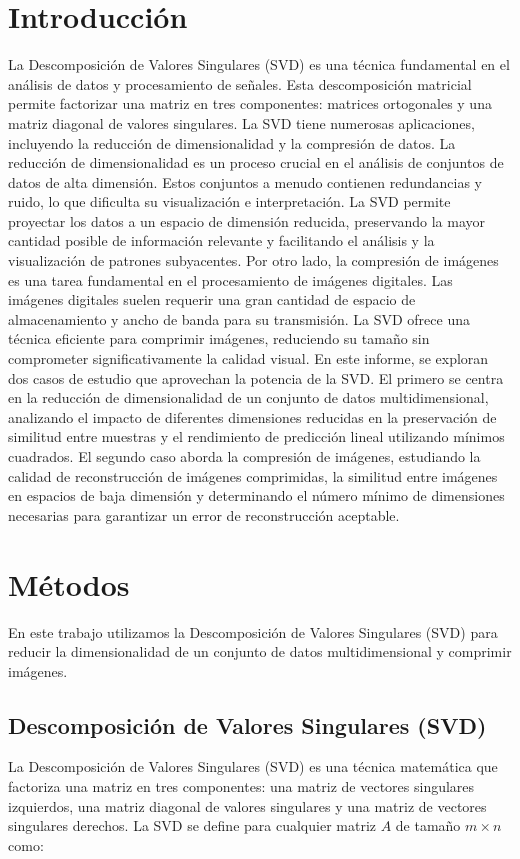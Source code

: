 \documentclass[12pt,a4]{article} %
\begin{document}
\section{Introducción}
La Descomposición de Valores Singulares (SVD) \cite{burdenfaires} es una técnica fundamental en el análisis de datos y procesamiento de señales. Esta descomposición matricial permite factorizar una matriz en tres componentes: matrices ortogonales y una matriz diagonal de valores singulares. La SVD tiene numerosas aplicaciones, incluyendo la reducción de dimensionalidad y la compresión de datos.
La reducción de dimensionalidad \cite{linaer_algebra} es un proceso crucial en el análisis de conjuntos de datos de alta dimensión. Estos conjuntos a menudo contienen redundancias y ruido, lo que dificulta su visualización e interpretación. La SVD permite proyectar los datos a un espacio de dimensión reducida, preservando la mayor cantidad posible de información relevante y facilitando el análisis y la visualización de patrones subyacentes.
Por otro lado, la compresión de imágenes es una tarea fundamental en el procesamiento de imágenes digitales. Las imágenes digitales suelen requerir una gran cantidad de espacio de almacenamiento y ancho de banda para su transmisión. La SVD ofrece una técnica eficiente para comprimir imágenes, reduciendo su tamaño sin comprometer significativamente la calidad visual.
En este informe, se exploran dos casos de estudio que aprovechan la potencia de la SVD. El primero se centra en la reducción de dimensionalidad de un conjunto de datos multidimensional, analizando el impacto de diferentes dimensiones reducidas en la preservación de similitud entre muestras y el rendimiento de predicción lineal utilizando mínimos cuadrados. El segundo caso aborda la compresión de imágenes, estudiando la calidad de reconstrucción de imágenes comprimidas, la similitud entre imágenes en espacios de baja dimensión y determinando el número mínimo de dimensiones necesarias para garantizar un error de reconstrucción aceptable.




\section{Métodos}
En este trabajo utilizamos la Descomposición de Valores Singulares (SVD) para reducir la dimensionalidad de un conjunto de datos multidimensional y comprimir imágenes. 

\subsection{Descomposición de Valores Singulares (SVD)}
\label{SVD}
La Descomposición de Valores Singulares (SVD) es una técnica matemática que factoriza una matriz en tres componentes: una matriz de vectores singulares izquierdos, una matriz diagonal de valores singulares y una matriz de vectores singulares derechos. La SVD se define para cualquier matriz \(A\) de tamaño \(m \times n\) como:
\end{document}
